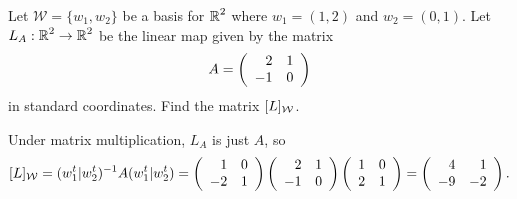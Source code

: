 \documentclass{ximera}
\begin{document}
\begin{exercise} \label{c7.3.1}
Let $\mathcal{W} = \{w_1,w_2\}$ be a basis for $\mbox{$\mathbb{R}$}^2$ where $w_1=(1,2)$ and $w_2=(0,1)$. Let
$L_A:\mbox{$\mathbb{R}$}^2\to\mbox{$\mathbb{R}$}^2$ be the linear map given by the matrix
\[
A=\left(\begin{array}{rr} 2 & 1\\ -1 &0\end{array}\right)
\]
in standard coordinates.  Find the matrix $[L]_{\cal W}$.

\begin{solution}

\soln Under matrix multiplication, $L_A$ is just $A$, so %
\[
[L]_{\cal W} = (w_1^t|w_2^t)^{-1}A(w_1^t|w_2^t) =
\left(\begin{array}{rr} 1 & 0\\ -2 &1\end{array}\right)\left(\begin{array}{rr} 2 & 1\\ -1 &0\end{array}\right)\left(\begin{array}{rr} 1 & 0\\ 2 &1\end{array}\right) =
\left(\begin{array}{rr} 4 & 1\\ -9 &-2\end{array}\right).
\]

\end{solution}
\end{exercise}
\end{document}
